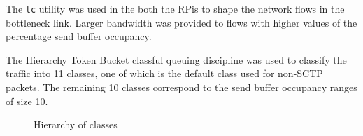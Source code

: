 The \texttt{tc} utility was used in the both the RPis to shape the
network flows in the bottleneck link. Larger bandwidth was
provided to flows with higher values of the percentage send buffer occupancy.

The Hierarchy Token Bucket classful queuing discipline was used to classify the
traffic into 11 classes, one of which is the default class used for non-SCTP
packets. The remaining 10 classes correspond to the send buffer occupancy
ranges of size 10.
\begin{figure}
  \caption{Hierarchy of classes}
\end{figure}
